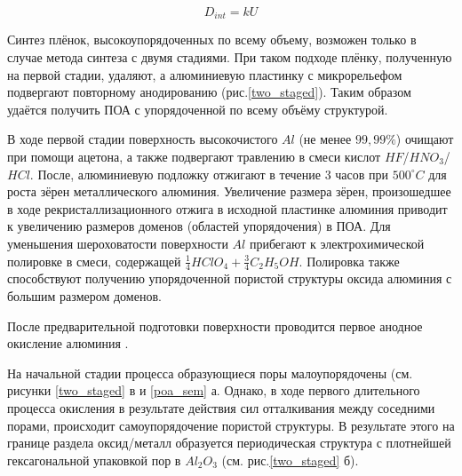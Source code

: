 \begin{equation}
D_{int}=kU
\end{equation}



Синтез плёнок, высокоупорядоченных по всему объему, возможен только в случае метода синтеза с двумя стадиями. При таком подходе плёнку, полученную на первой стадии, удаляют, а алюминиевую пластинку с микрорельефом подвергают повторному анодированию (рис.\ref{two_staged}). Таким образом удаётся получить ПОА с упорядоченной по всему объёму структурой.

В ходе первой стадии поверхность высокочистого $Al$ (не менее $99,99\%$) очищают при помощи ацетона, а также  подвергают травлению в смеси кислот $HF$/$HNO_3$/$HCl$. После, алюминиевую подложку отжигают в течение 3 часов при $500^{\circ}C$ для роста зёрен металлического алюминия. Увеличение размера зёрен, произошедшее в ходе рекристаллизационного отжига в исходной пластинке алюминия приводит к увеличению размеров доменов (областей упорядочения) в ПОА. Для уменьшения шероховатости поверхности $Al$ прибегают к электрохимической полировке в смеси, содержащей $\frac{1}{4}HClO_4 + \frac{3}{4}C_2H_5OH$. Полировка также способствуют получению упорядоченной пористой структуры оксида алюминия с большим размером доменов.

После предварительной подготовки поверхности проводится первое анодное окисление алюминия \cite{napolsky-sintez}.


На начальной стадии процесса образующиеся поры малоупорядочены (см. рисунки \ref{two_staged} в и \ref{poa_sem} а. Однако, в ходе первого длительного процесса окисления в результате действия сил отталкивания между соседними порами, происходит самоупорядочение пористой структуры. В результате этого на границе раздела оксид/металл образуется периодическая структура с плотнейшей гексагональной упаковкой пор в $Al_2O_3$ (см. рис.\ref{two_staged} б).

